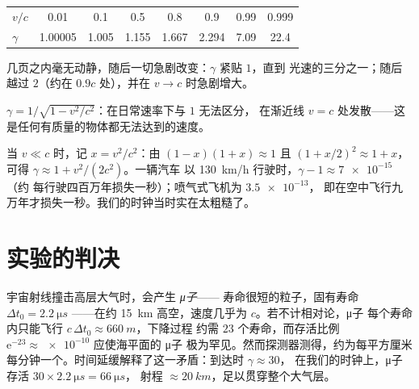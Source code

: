 \begin{example}[伽马的数值]\label{ex:g12:special-relativity:gammatable}
\begin{center}\small
\begin{tabular}{lccccccc}
$v/c$    & 0.01     & 0.1   & 0.5   & 0.8   & 0.9   & 0.99 & 0.999\\
$\gamma$ & 1.00005 & 1.005 & 1.155 & 1.667 & 2.294 & 7.09 & 22.4
\end{tabular}
\end{center}
几页之内毫无动静，随后一切急剧改变：$\gamma$ 紧贴 $1$，直到
光速的三分之一；随后越过 $2$（约在 $0.9c$ 处），并在 $v \to c$ 时急剧增大。
\end{example}

\begin{omfigure}

{\small $\gamma = 1/\sqrt{1 - v^2/c^2}$：在日常速率下与 $1$ 无法区分，
在渐近线 $v = c$ 处发散——这是任何有质量的物体都无法达到的速度。}
\end{omfigure}

\begin{remark}[日常生活为何从未察觉]\label{rem:g12:special-relativity:everyday}
当 $v \ll c$ 时，记 $x = v^2/c^2$：由 $(1-x)(1+x) \approx 1$ 且
$(1 + x/2)^2 \approx 1 + x$，可得 $\gamma \approx 1 + v^2/(2c^2)$。一辆汽车
以 \qty{130}{km/h} 行驶时，$\gamma - 1 \approx \num{7e-15}$（约
每行驶四百万年损失一秒）；喷气式飞机为 $\num{3.5e-13}$，
即在空中飞行九万年才损失一秒。我们的时钟当时实在太粗糙了。
\end{remark}

\section{实验的判决}

\begin{example}[μ子抵达地面]\label{ex:g12:special-relativity:muons}
宇宙射线撞击高层大气时，会产生 \emph{μ子}——
寿命很短的粒子，固有寿命 $\Delta t_0 = \qty{2.2}{\micro s}$
——在约 \qty{15}{km} 高空，速度几乎为 $c$。若不计相对论，μ子
每个寿命内只能飞行 $c\,\Delta t_0 \approx \qty{660}{m}$，下降过程
约需 $23$ 个寿命，而存活比例
$\mathrm{e}^{-23} \approx \num{e-10}$ 应使海平面的 μ子
极为罕见。然而探测器测得，约为每平方厘米
每分钟一个。时间延缓解释了这一矛盾：到达时 $\gamma \approx 30$，
在我们的时钟上，μ子存活 $30 \times \qty{2.2}{\micro s} = \qty{66}{\micro s}$，
射程 $\approx \qty{20}{km}$，足以贯穿整个大气层。
\end{example}

